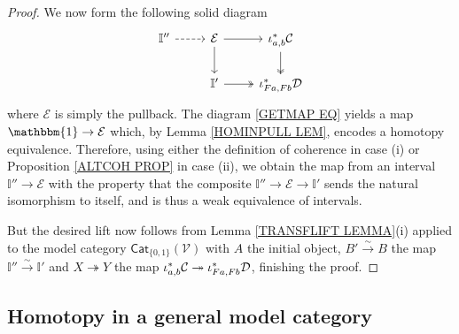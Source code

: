 \documentclass[a4paper,10pt
,draft
]{article}%
\numberwithin{equation}{section}
\numberwithin{figure}{section}
\theoremstyle{definition} %
\newcommand{\V}{\ensuremath{\mathcal V}}
\newcommand{\1}{\ensuremath{\mathbbm 1}}%
\begin{document}
\begin{proof}
We now form the following solid diagram
\begin{equation}
\begin{tikzcd}
	\mathbb{I}'' \ar[dashed]{r}
&
	\mathcal{E} \ar{d} \ar{r}
&
	\iota^{\**}_{a,b} \mathcal{C} \ar[twoheadrightarrow]{d}
\\
	&
	\mathbb{I}' \ar[twoheadrightarrow]{r} 
&
	\iota^{\**}_{Fa,Fb} \mathcal{D}
\end{tikzcd}
\end{equation}
where $\mathcal{E}$ is simply the pullback.
The diagram 
\eqref{GETMAP EQ}
yields a map $\mathbbm{1} \to \mathcal{E}$ which,
by Lemma \ref{HOMINPULL LEM},
encodes a homotopy equivalence.
Therefore, using either the definition of coherence in case (i) or Proposition \ref{ALTCOH PROP} in case (ii),
we obtain the map from an interval 
$\mathbb{I}'' \to \mathcal{E}$
with the property that 
the composite 
$\mathbb{I}'' \to \mathcal{E} \to \mathbb{I}'$
sends the natural isomorphism to itself, 
and is thus a weak equivalence of intervals.

But the desired lift now follows from 
Lemma \ref{TRANSFLIFT LEMMA}(i)
applied to the model category
$\mathsf{Cat}_{\{0,1\}}(\V)$
with $A$ the initial object,
$B' \xrightarrow{\sim} B$ the map
$\mathbb{I}'' \xrightarrow{\sim} \mathbb{I}'$
and $X \twoheadrightarrow Y$
the map 
$\iota^{\**}_{a,b} \mathcal{C}
\twoheadrightarrow
\iota^{\**}_{Fa,Fb} \mathcal{D}$,
finishing the proof.
\end{proof}






\newpage





\subsection{Homotopy in a general model category}
\end{document}
